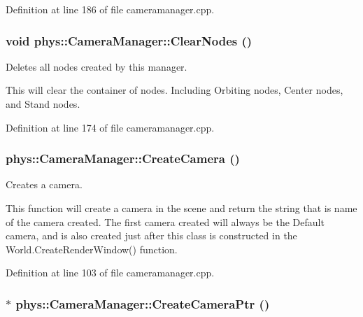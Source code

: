 Definition at line 186 of file cameramanager.cpp.

\hypertarget{classphys_1_1CameraManager_a42d91612bbaa00187944290d6bfd44e9}{
\subsubsection[{ClearNodes}]{\setlength{\rightskip}{0pt plus 5cm}void phys::CameraManager::ClearNodes ()}}
\label{d9/d91/classphys_1_1CameraManager_a42d91612bbaa00187944290d6bfd44e9}


Deletes all nodes created by this manager. 

This will clear the container of nodes. Including Orbiting nodes, Center nodes, and Stand nodes. 

Definition at line 174 of file cameramanager.cpp.

\hypertarget{classphys_1_1CameraManager_ac6ff80c91fa5a2cd21ebd8b78db9add2}{
\subsubsection[{CreateCamera}]{ phys::CameraManager::CreateCamera ()}}
\label{d9/d91/classphys_1_1CameraManager_ac6ff80c91fa5a2cd21ebd8b78db9add2}


Creates a camera. 

This function will create a camera in the scene and return the string that is name of the camera created. The first camera created will always be the Default camera, and is also created just after this class is constructed in the World.CreateRenderWindow() function. 

Definition at line 103 of file cameramanager.cpp.

\hypertarget{classphys_1_1CameraManager_ae51f79b63b5c34959bc4cfbef34b8f08}{
\subsubsection[{CreateCameraPtr}]{ $\ast$ phys::CameraManager::CreateCameraPtr ()}}
\label{d9/d91/classphys_1_1CameraManager_ae51f79b63b5c34959bc4cfbef34b8f08}



